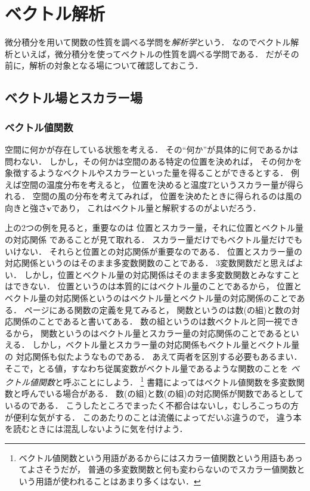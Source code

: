 \chapter{ベクトル解析}
微分積分を用いて関数の性質を調べる学問を\emph{解析学}という．
なのでベクトル解析といえば，微分積分を使ってベクトルの性質を調べる学問である．
だがその前に，解析の対象となる場について確認しておこう．

\section{ベクトル場とスカラー場}
\subsection{ベクトル値関数}
空間に何かが存在している状態を考える．
その``何か''が具体的に何であるかは問わない．
しかし，その何かは空間のある特定の位置を決めれば，
その何かを象徴するようなベクトルやスカラーといった量を得ることができるとする．
例えば空間の温度分布を考えると，
位置を決めると温度$T$というスカラー量が得られる．
空間の風の分布を考えてみれば，
位置を決めたときに得られるのは風の向きと強さ$\bm{v}$であり，
これはベクトル量と解釈するのがよいだろう．

上の2つの例を見ると，重要なのは
位置とスカラー量，それに位置とベクトル量の対応関係
であることが見て取れる．
スカラー量だけでもベクトル量だけでもいけない．
それらと位置との対応関係が重要なのである．
位置とスカラー量の対応関係というのはそのまま多変数関数のことである．
3変数関数だと思えばよい．
しかし，位置とベクトル量の対応関係はそのまま多変数関数とみなすことはできない．
位置というのは本質的にはベクトル量のことであるから，
位置とベクトル量の対応関係というのはベクトル量とベクトル量の対応関係のことである．
\pageref{eq:nhensu}ページにある関数の定義を見てみると，
関数というのは数(の組)と数の対応関係のことであると書いてある．
数の組というのは数ベクトルと同一視できるから，
関数というのはベクトル量とスカラー量の対応関係のことであるといえる．
しかし，ベクトル量とスカラー量の対応関係もベクトル量とベクトル量の
対応関係も似たようなものである．
あえて両者を区別する必要もあるまい．
そこで，とる値，すなわち従属変数がベクトル量であるような関数のことを
\emph{ベクトル値関数}と呼ぶことにしよう．
\footnote{ベクトル値関数という用語があるからにはスカラー値関数という用語もあってよさそうだが，
普通の多変数関数と何も変わらないのでスカラー値関数という用語が使われることはあまり多くはない．}
書籍によってはベクトル値関数を多変数関数と呼んでいる場合がある．
数(の組)と数(の組)の対応関係が関数であるとしているのである．
こうしたところでまったく不都合はないし，むしろこっちの方が便利な気がする．
このあたりのことは流儀によってだいぶ違うので，
違う本を読むときには混乱しないように気を付けよう．

